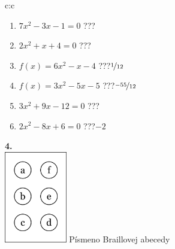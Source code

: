 \documentclass[10pt]{report}
\begin{document}
\begin{tabular}{c:c}
\begin{minipage}[c][104.5mm][t]{0.5\linewidth}
\begin{center}
\begin{minipage}{0.79\linewidth}
\begin{center}
\begin{varwidth}{\linewidth}
\begin{enumerate}
\Large
\item $7x^2-3x-1=0$\quad \dotfill\; ???\;\dotfill {}
\item $2x^2+x+4=0$\quad \dotfill\; ???\;\dotfill {}
\item $f(x)=6x^2-x-4$\quad \dotfill\; ???\;\dotfill \quad $\nicefrac{1}{12}$
\item $f(x)=3x^2-5x-5$\quad \dotfill\; ???\;\dotfill \quad $\nicefrac{-55}{12}$
\item $3x^2+9x-12=0$\quad \dotfill\; ???\;\dotfill {}
\item $2x^2-8x+6=0$\quad \dotfill\; ???\;\dotfill \quad $-2$
\end{enumerate}
\end{varwidth}
\end{center}
\end{minipage}
\begin{minipage}{0.20\linewidth}
\begin{center}
{\Huge\bfseries 4.} \\[2mm]
\includegraphics[height=40mm]{../images/braille.png}
{\small Písmeno Braillovej abecedy}
\end{center}
\end{minipage}
\end{center}
\end{minipage}
%
\end{tabular}
\newpage
\thispagestyle{empty}
\end{document}
